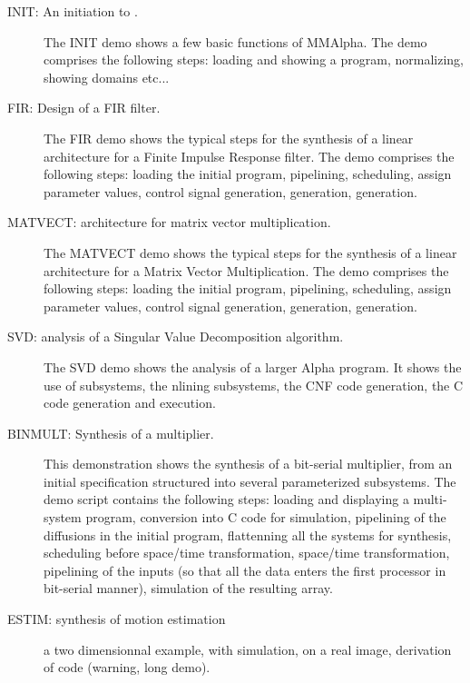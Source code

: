 \begin{description}
 \item [INIT: An initiation to {\mmalfa}.] The INIT demo shows a few
  basic functions of MMAlpha. The demo comprises the following steps:
  loading and showing a program, normalizing, showing domains etc...

 \item [FIR: Design of a FIR filter.]  The FIR demo shows the typical
steps for the synthesis of a linear architecture for a Finite Impulse
Response filter.  The demo comprises the following steps: loading the
initial program, pipelining, scheduling, assign parameter values,
control signal generation, {\alphaz} generation, {\alphard} generation.

 \item [MATVECT: architecture for matrix vector
multiplication.] 
The MATVECT demo shows the typical steps for the
synthesis of a linear architecture for a Matrix Vector Multiplication.
The demo comprises the following steps: loading the initial program,
pipelining, scheduling, assign parameter values, control signal
generation,  {\alphaz} generation, {\alphard} generation.



 \item [SVD: analysis of a Singular Value Decomposition
algorithm.]  The SVD demo shows the analysis of a larger Alpha
program. It shows the use of subsystems, the nlining subsystems, the
CNF code generation, the C code generation and execution.


 \item [BINMULT: Synthesis of a multiplier.]  This demonstration
shows the synthesis of a bit-serial multiplier, from an initial
specification structured into several parameterized subsystems.  The
demo script contains the following steps: loading and displaying a
multi-system program, conversion into C code for simulation,
pipelining of the diffusions in the initial program, flattenning all
the systems for synthesis, scheduling before space/time
transformation, space/time transformation, pipelining of the inputs
(so that all the data enters the first processor in bit-serial
manner), simulation of the resulting array.

\item [ESTIM: synthesis of motion estimation] a two dimensionnal example, with 
simulation, on a real image, derivation of {\alphaz} code (warning, long demo).
\end{description}